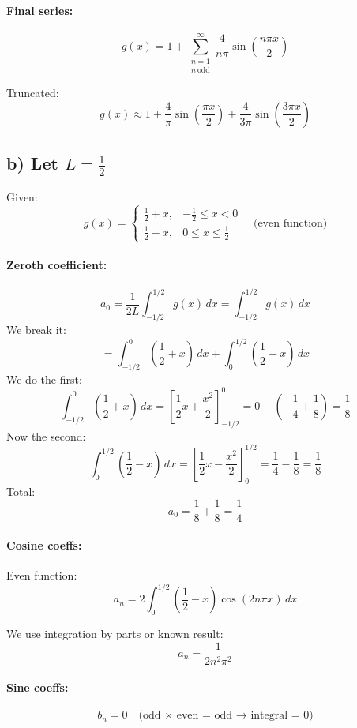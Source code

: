 \documentclass{article}
\begin{document}
\paragraph{Final series:}
\[
g(x) = 1 + \sum_{\substack{n=1 \\ n\ \text{odd}}}^\infty \frac{4}{n\pi} \sin\left( \frac{n\pi x}{2} \right)
\]

Truncated:
\[
g(x) \approx 1 + \frac{4}{\pi} \sin\left( \frac{\pi x}{2} \right) + \frac{4}{3\pi} \sin\left( \frac{3\pi x}{2} \right)
\]

\subsection*{b) Let \( L = \frac{1}{2} \)}

Given:
\[
g(x) =
\begin{cases}
\frac{1}{2} + x, & -\frac{1}{2} \le x < 0 \\
\frac{1}{2} - x, & 0 \le x \le \frac{1}{2}
\end{cases}
\quad \text{(even function)}
\]

\paragraph{Zeroth coefficient:}
\[
a_0 = \frac{1}{2L} \int_{-1/2}^{1/2} g(x)\,dx = \int_{-1/2}^{1/2} g(x)\,dx
\]
We break it:
\[
= \int_{-1/2}^{0} \left( \frac{1}{2} + x \right)\,dx + \int_0^{1/2} \left( \frac{1}{2} - x \right)\,dx
\]
We do the first:
\[
\int_{-1/2}^{0} \left( \frac{1}{2} + x \right)\,dx = \left[ \frac{1}{2}x + \frac{x^2}{2} \right]_{-1/2}^{0}
= 0 - \left( -\frac{1}{4} + \frac{1}{8} \right) = \frac{1}{8}
\]
Now the second:
\[
\int_0^{1/2} \left( \frac{1}{2} - x \right)\,dx = \left[ \frac{1}{2}x - \frac{x^2}{2} \right]_0^{1/2}
= \frac{1}{4} - \frac{1}{8} = \frac{1}{8}
\]
Total:
\[
a_0 = \frac{1}{8} + \frac{1}{8} = \frac{1}{4}
\]

\paragraph{Cosine coeffs:}
Even function:
\[
a_n = 2 \int_0^{1/2} \left( \frac{1}{2} - x \right) \cos(2n\pi x)\,dx
\]

We use integration by parts or known result:
\[
a_n = \frac{1}{2n^2\pi^2}
\]

\paragraph{Sine coeffs:}
\[
b_n = 0 \quad \text{(odd × even = odd → integral = 0)}
\]
\end{document}
